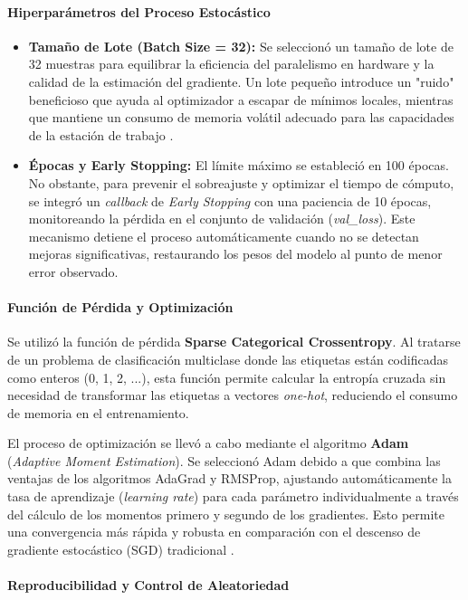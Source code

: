 	\paragraph{Hiperparámetros del Proceso Estocástico}
	\begin{itemize}
		\item \textbf{Tamaño de Lote (Batch Size = 32):} Se seleccionó un tamaño de lote de 32 muestras para equilibrar la eficiencia del paralelismo en hardware y la calidad de la estimación del gradiente. Un lote pequeño introduce un "ruido" beneficioso que ayuda al optimizador a escapar de mínimos locales, mientras que mantiene un consumo de memoria volátil adecuado para las capacidades de la estación de trabajo \cite{Goodfellow2016}.
		\item \textbf{Épocas y Early Stopping:} El límite máximo se estableció en 100 épocas. No obstante, para prevenir el sobreajuste y optimizar el tiempo de cómputo, se integró un \textit{callback} de \textit{Early Stopping} con una paciencia de 10 épocas, monitoreando la pérdida en el conjunto de validación (\textit{val\_loss}). Este mecanismo detiene el proceso automáticamente cuando no se detectan mejoras significativas, restaurando los pesos del modelo al punto de menor error observado.
	\end{itemize}
	
	\paragraph{Función de Pérdida y Optimización}
	Se utilizó la función de pérdida \textbf{Sparse Categorical Crossentropy}. Al tratarse de un problema de clasificación multiclase donde las etiquetas están codificadas como enteros (0, 1, 2, ...), esta función permite calcular la entropía cruzada sin necesidad de transformar las etiquetas a vectores \textit{one-hot}, reduciendo el consumo de memoria en el entrenamiento.
	
	El proceso de optimización se llevó a cabo mediante el algoritmo \textbf{Adam} (\textit{Adaptive Moment Estimation}). Se seleccionó Adam debido a que combina las ventajas de los algoritmos AdaGrad y RMSProp, ajustando automáticamente la tasa de aprendizaje (\textit{learning rate}) para cada parámetro individualmente a través del cálculo de los momentos primero y segundo de los gradientes. Esto permite una convergencia más rápida y robusta en comparación con el descenso de gradiente estocástico (SGD) tradicional \cite{Kingma2014Adam}.
	
	\paragraph{Reproducibilidad y Control de Aleatoriedad}
	
